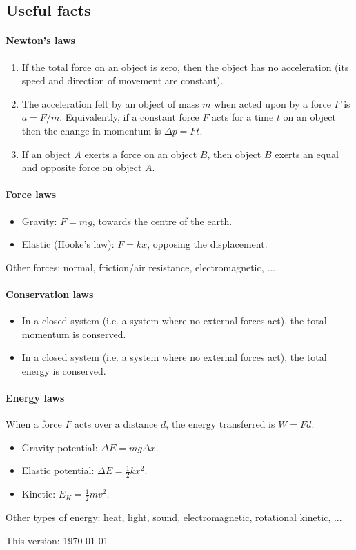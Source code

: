 \documentclass[answers]{exam}
\begin{document}
\clearpage
\subsection*{Useful facts}
\paragraph{Newton's laws}
\begin{enumerate}
  \item If the total force on an object is zero, then the object has no acceleration (its speed and direction of movement are constant).
  \item The acceleration felt by an object of mass $ m $ when acted upon by a force $ F $ is $ a = F/m $. Equivalently,
        if a constant force $ F $ acts for a time $ t $ on an object then the change in momentum is $ \Delta p = Ft $.
  \item If an object $ A $ exerts a force on an object $ B $, then object $ B $ exerts an equal and opposite force on object $ A $.
\end{enumerate}

\paragraph{Force laws}
\begin{itemize}
  \item Gravity: $ F = mg $, towards the centre of the earth.
  \item Elastic (Hooke's law): $ F = kx $, opposing the displacement.
\end{itemize}

Other forces: normal, friction/air resistance, electromagnetic, ...

\paragraph{Conservation laws}
\begin{itemize}
  \item In a closed system (i.e. a system where no external forces act), the total momentum is conserved.
  \item In a closed system (i.e. a system where no external forces act), the total energy is conserved.
\end{itemize}

\paragraph{Energy laws}
When a force $ F $ acts over a distance $ d $, the energy transferred is $ W = Fd $.

\begin{itemize}
  \item Gravity potential: $ \Delta E = mg \Delta x $.
  \item Elastic potential: $ \Delta E = \frac{1}{2} k x^2 $.
  \item Kinetic: $ E_K = \frac{1}{2} mv^2 $.
\end{itemize}

Other types of energy: heat, light, sound, electromagnetic, rotational kinetic, ...


\vspace*{\fill}
This version: \today
\end{document}
